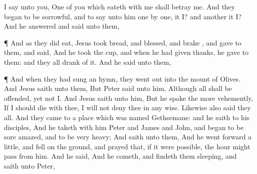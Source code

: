 {{{I say
unto you,
One
of
you
which
eateth
with
me
shall betray
me.}}
And they
began to be
sorrowful,
and to
say unto
him
one
by
one,
{}
it
I?
and
another
{}
it
I?
And he
answered and
said unto
them,
{}
\par }{\PP {}¶
And as
they did
eat,
Jesus
took
bread, and
blessed, and
brake
{},
and
gave to
them,
and
said,
{}
And he
took the
cup, and when he had given
thanks, he
gave
{} to
them:
and
they
all
drank
of
it.
And he
said unto
them,
{}
\par }{\PP {}¶
And when they had sung an
hymn, they went
out
into the
mount of
Olives.
And
Jesus
saith unto
them,
{}
But
Peter
said unto
him,
Although
all shall be
offended,
yet
{}
not
I.
And
Jesus
saith unto
him,
{}
But he
spake the
more
vehemently,
If
I
should
die
with
thee, I
will
not
deny
thee in any
wise.
Likewise
also said
they
all.
And they
came
to a
place which
was
named
Gethsemane:
and he
saith to
his
disciples,
{}
And he
taketh
with
him
Peter
and
James
and
John,
and
began to be sore
amazed,
and to be very
heavy;
And
saith unto
them,
{}
And he went
forward a
little, and
fell
on the
ground,
and
prayed
that,
if it
were
possible, the
hour might
pass
from
him.
And he
said,
{}
And he
cometh,
and
findeth
them
sleeping,
and
saith unto
Peter,
{}
}
